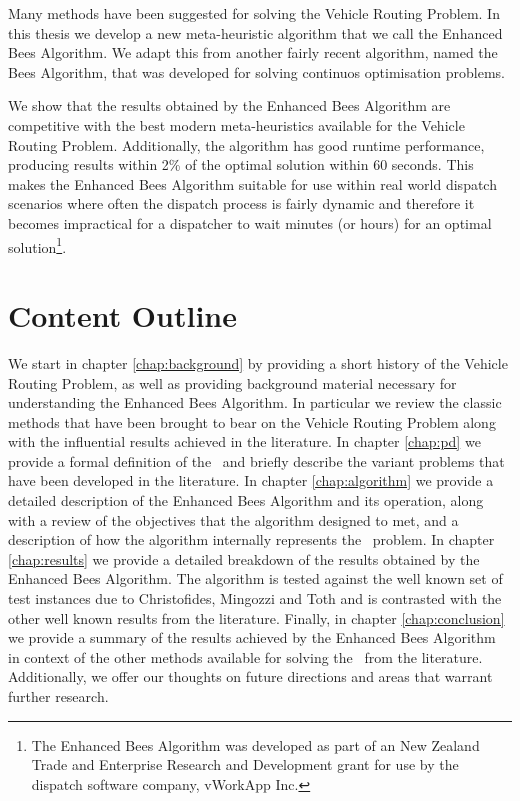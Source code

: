 Many methods have been suggested for solving the Vehicle Routing Problem. In this thesis we develop a new meta-heuristic algorithm that we call the Enhanced Bees Algorithm. We adapt this from another fairly recent algorithm, named the Bees Algorithm, that was developed for solving continuos optimisation problems.

We show that the results obtained by the Enhanced Bees Algorithm are competitive with the best modern meta-heuristics available for the Vehicle Routing Problem. Additionally, the algorithm has good runtime performance, producing results within 2\% of the optimal solution within 60 seconds. This makes the Enhanced Bees Algorithm suitable for use within real world dispatch scenarios where often the dispatch process is fairly dynamic and therefore it becomes impractical for a dispatcher to wait minutes (or hours) for an optimal solution\footnote{The Enhanced Bees Algorithm was developed as part of an New Zealand Trade and Enterprise Research and Development grant for use by the dispatch software company, vWorkApp Inc.}.

\section{Content Outline}

We start in chapter \ref{chap:background} by providing a short history of the Vehicle Routing Problem, as well as providing background material necessary for understanding the Enhanced Bees Algorithm. In particular we review the classic methods that have been brought to bear on the Vehicle Routing Problem along with the influential results achieved in the literature. In chapter \ref{chap:pd} we provide a formal definition of the \VRP\ and briefly describe the variant problems that have been developed in the literature. In chapter \ref{chap:algorithm} we provide a detailed description of the Enhanced Bees Algorithm and its operation, along with a review of the objectives that the algorithm designed to met, and a description of how the algorithm internally represents the \VRP\ problem. In chapter \ref{chap:results} we provide a detailed breakdown of the results obtained by the Enhanced Bees Algorithm. The algorithm is tested against the well known set of test instances due to Christofides, Mingozzi and Toth \cite{CMT:1981} and is contrasted with the other well known results from the literature. Finally, in chapter \ref{chap:conclusion} we provide a summary of the results achieved by the Enhanced Bees Algorithm in context of the other methods available for solving the \VRP\ from the literature. Additionally, we offer our thoughts on future directions and areas that warrant further research.  




 

